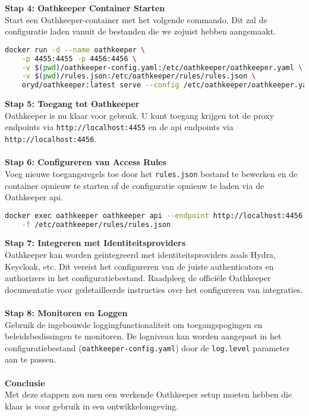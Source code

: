 \textbf{Stap 4: Oathkeeper Container Starten}\\
Start een Oathkeeper-container met het volgende commando. Dit zal de configuratie laden vanuit de bestanden die we zojuist hebben aangemaakt.
\begin{lstlisting}[language=bash, caption=Oathkeeper Docker Image starten]
docker run -d --name oathkeeper \
    -p 4455:4455 -p 4456:4456 \
    -v $(pwd)/oathkeeper-config.yaml:/etc/oathkeeper/oathkeeper.yaml \
    -v $(pwd)/rules.json:/etc/oathkeeper/rules/rules.json \
    oryd/oathkeeper:latest serve --config /etc/oathkeeper/oathkeeper.yaml
\end{lstlisting}
\textbf{Stap 5: Toegang tot Oathkeeper}\\
Oathkeeper is nu klaar voor gebruik. U kunt toegang krijgen tot de proxy endpoints via \texttt{http://localhost:4455} en de \gls{api} endpoints via \texttt{http://localhost:4456}.\\\\
\textbf{Stap 6: Configureren van Access Rules}\\
Voeg nieuwe toegangsregels toe door het \texttt{rules.json} bestand te bewerken en de container opnieuw te starten of de configuratie opnieuw te laden via de Oathkeeper \gls{api}.\@
\begin{lstlisting}[language=bash, caption=Oathkeeper Access Rules configureren]
docker exec oathkeeper oathkeeper api --endpoint http://localhost:4456 rules create \
    -f /etc/oathkeeper/rules/rules.json
\end{lstlisting}
\textbf{Stap 7: Integreren met Identiteitsproviders}\\
Oathkeeper kan worden geïntegreerd met identiteitsproviders zoals Hydra, Keycloak, etc. Dit vereist het configureren van de juiste authenticators en authorizers in het configuratiebestand. Raadpleeg de officiële Oathkeeper documentatie voor gedetailleerde instructies over het configureren van integraties.\\\\
\textbf{Stap 8: Monitoren en Loggen}\\
Gebruik de ingebouwde loggingfunctionaliteit om toegangspogingen en beleidsbeslissingen te monitoren. De logniveau kan worden aangepast in het configuratiebestand (\texttt{oathkeeper-config.yaml}) door de \texttt{log.level} parameter aan te passen.\\\\
\textbf{Conclusie}\\
Met deze stappen zou men een werkende Oathkeeper setup moeten hebben die klaar is voor gebruik in een ontwikkelomgeving.


